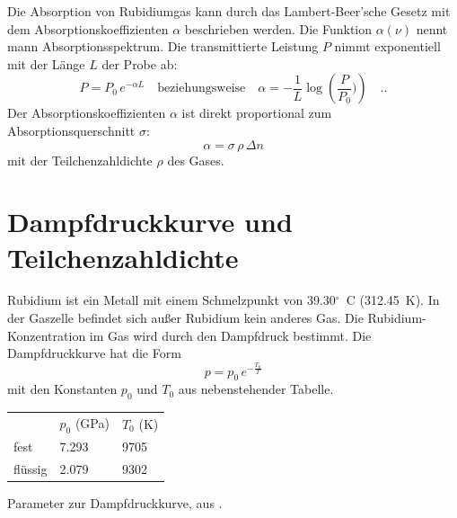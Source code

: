 Die Absorption von Rubidiumgas kann durch das Lambert-Beer'sche Gesetz mit dem Absorptionskoeffizienten $\alpha$ beschrieben werden. Die Funktion $\alpha(\nu)$ nennt mann Absorptionsspektrum. Die transmittierte Leistung $P$ nimmt exponentiell mit der Länge $L$ der Probe ab:
\begin{equation}
	P = P_0  \, e^{- \alpha L} \quad \text{beziehungsweise} \quad 
	\alpha = -\frac{1}{L} \log \left( \frac{P}{P_0}) \right) \quad .
	. \label{eq:lambert_beer}
\end{equation}
Der Absorptionskoeffizienten $\alpha$ ist direkt proportional zum Absorptionsquerschnitt $\sigma$:
\begin{equation}
	\alpha = \sigma  \, \rho  \, \Delta n
\end{equation}
mit der Teilchenzahldichte $\rho$ des Gases.


\begin{questions}
\end{questions}


\section{Dampfdruckkurve und Teilchenzahldichte}

Rubidium ist ein Metall mit einem Schmelzpunkt von 39.30$^\circ$~C (312.45~K). In der Gaszelle befindet sich außer Rubidium kein anderes Gas. Die Rubidium-Konzentration im Gas wird durch den Dampfdruck bestimmt. Die Dampfdruckkurve hat die Form
\begin{equation}
    p = p_0 \, e^{- \frac{T_0}{T}}
\end{equation}
mit den Konstanten $p_0$ und $T_0$ aus nebenstehender Tabelle. 

\begin{margintable}
    \begin{tabular}{lll}
           & $p_0$ (GPa) & $T_0$ (K) \\
           fest  &  7.293   & 9705 \\
           flüssig  &  2.079  & 9302 \\
    \end{tabular}
	\caption{Parameter zur Dampfdruckkurve, aus \cite{Data85}.}
\end{margintable}



